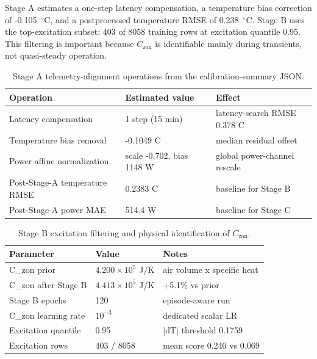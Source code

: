 \documentclass[11pt,a4paper]{article}
\newcommand{\Czon}{\ensuremath{C_{\mathrm{zon}}}}
\begin{document}
Stage A estimates a one-step latency compensation, a temperature bias correction of -0.105~$^\circ$C, and a postprocessed temperature RMSE of 0.238~$^\circ$C. Stage B uses the top-excitation subset: 403 of 8058 training rows at excitation quantile 0.95. This filtering is important because \(\Czon\) is identifiable mainly during transients, not quasi-steady operation.

\begin{table}[H]
\centering
\small
\caption{Stage A telemetry-alignment operations from the calibration-summary JSON.}
\label{tab:stage-a}
\begin{tabularx}{\linewidth}{llX}
\toprule
Operation & Estimated value & Effect \\
\midrule
Latency compensation & 1 step (15 min) & latency-search RMSE 0.378 C \\
Temperature bias removal & -0.1049 C & median residual offset \\
Power affine normalization & scale -0.702, bias 1148 W & global power-channel rescale \\
Post-Stage-A temperature RMSE & 0.2383 C & baseline for Stage B \\
Post-Stage-A power MAE & 514.4 W & baseline for Stage C \\
\bottomrule
\end{tabularx}
\end{table}

\begin{table}[H]
\centering
\small
\caption{Stage B excitation filtering and physical identification of \(\Czon\).}
\label{tab:stage-b}
\begin{tabularx}{\linewidth}{llX}
\toprule
Parameter & Value & Notes \\
\midrule
C\_zon prior & $4.200\times10^5$ J/K & air volume x specific heat \\
C\_zon after Stage B & $4.413\times10^5$ J/K & +5.1\% vs prior \\
Stage B epochs & 120 & episode-aware run \\
C\_zon learning rate & $10^{-3}$ & dedicated scalar LR \\
Excitation quantile & 0.95 & |dT| threshold 0.1759 \\
Excitation rows & 403 / 8058 & mean score 0.240 vs 0.069 \\
\bottomrule
\end{tabularx}
\end{table}
\end{document}
